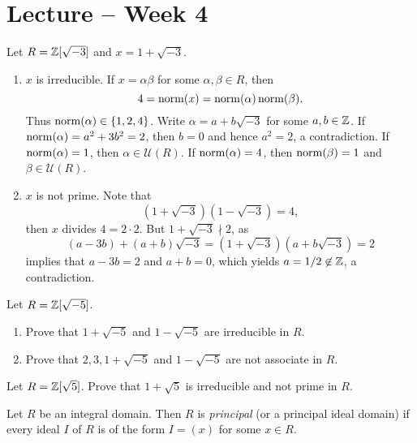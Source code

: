\section{Lecture -- Week 4}

\begin{example}
	Let $R=\mathbb{Z}[\sqrt{-3}]$ and $x=1+\sqrt{-3}$. 
	\begin{enumerate}
		\item $x$ is irreducible. 
	If $x=\alpha\beta$ for some $\alpha,\beta\in R$, then 
	\[
 4=\operatorname{norm}(x)=\operatorname{norm}(\alpha)\operatorname{norm}(\beta).
 \]
 Thus $\operatorname{norm}(\alpha)\in\{1,2,4\}$. 
	Write $\alpha=a+b\sqrt{-3}$ for some $a,b\in\mathbb{Z}$. 
	If $\operatorname{norm}(\alpha)=a^2+3b^2=2$, then $b=0$ and hence
	$a^2=2$, a contradiction. If $\operatorname{norm}(\alpha)=1$, then $\alpha\in\mathcal{U}(R)$.
	If $\operatorname{norm}(\alpha)=4$, then $\operatorname{norm}(\beta)=1$ and $\beta\in\mathcal{U}(R)$. 
%
%	
%	
		\item $x$ is not prime. Note that 
  \[
  (1+\sqrt{-3})(1-\sqrt{-3})=4,
  \]
  then 
		$x$ divides $4=2\cdot 2$. But $1+\sqrt{-3}\nmid 2$, as 
		\[
		(a-3b)+(a+b)\sqrt{-3}=(1+\sqrt{-3})(a+b\sqrt{-3})=2
		\]
		implies that $a-3b=2$ and $a+b=0$, which yields 
		$a=1/2\not\in\mathbb{Z}$, a contradiction.
	\end{enumerate}
\end{example}

\begin{exercise}
	Let $R=\mathbb{Z}[\sqrt{-5}]$. 
	\begin{enumerate}
		\item Prove that $1+\sqrt{-5}$ and $1-\sqrt{-5}$ are irreducible in $R$. 
		\item Prove that $2,3,1+\sqrt{-5}$ and $1-\sqrt{-5}$ are not associate in $R$.
	\end{enumerate}
\end{exercise}

\begin{exercise}
	Let $R=\mathbb{Z}[\sqrt{5}]$. 
	Prove that $1+\sqrt{5}$ is irreducible and not prime in $R$. 	
\end{exercise}

\begin{definition}
	Let $R$ be an integral domain. Then $R$ is \emph{principal} 
	(or a principal ideal domain) if
	every ideal $I$ of $R$ is of the form $I=(x)$ for some $x\in R$.   
\end{definition}

